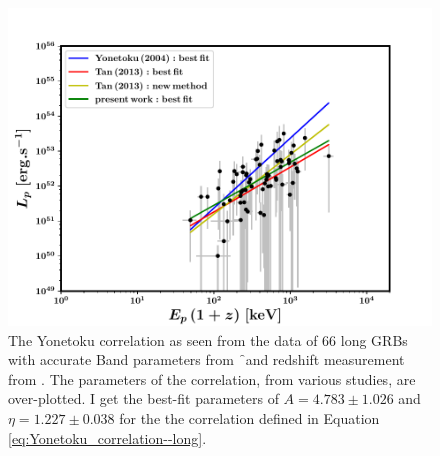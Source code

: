 \begin{figure}
\begin{center}
\includegraphics[scale=0.5]{L_vs_Ep0--correlations--my_bestfit}
\caption[Yonetoku correlation of long GRBs]{The Yonetoku correlation as seen from the data of $66$ long GRBs with accurate Band parameters from \f\ and redshift measurement from \s. The parameters of the correlation, from various studies, are over-plotted. I get the best-fit parameters of $A = 4.783 \pm 1.026$ and $\eta = 1.227 \pm 0.038$ for the the correlation defined in Equation \ref{eq:Yonetoku_correlation--long}.}
\label{fig:Yonetoku_correlation--long}
\end{center}
\end{figure}

